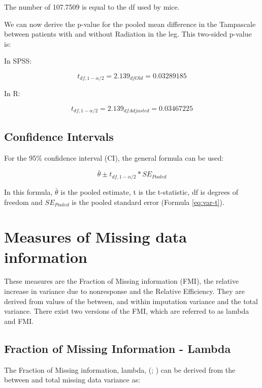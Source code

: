 \documentclass[
]{book}
\begin{document}
The number of 107.7509 is equal to the df used by mice.

We can now derive the p-value for the pooled mean difference in the Tampascale between patients with and without Radiation in the leg. This two-sided p-value is:

In SPSS:

\[t_{df,1-\alpha/2}=2.139_{df{Old}}=0.03289185\]

In R:

\[t_{df,1-\alpha/2}=2.139_{df{Adjusted}}=0.03467225\]

\hypertarget{confidence-intervals}{%
\section{Confidence Intervals}\label{confidence-intervals}}

For the 95\% confidence interval (CI), the general formula can be used:

\begin{equation}
\bar{\theta} ± t_{df,1-\alpha/2} * SE_{Pooled}
  \label{eq:conf}
\end{equation}

In this formula, \(\bar{\theta}\) is the pooled estimate, t is the t-statistic, df is degrees of freedom and \(SE_{Pooled}\) is the pooled standard error (Formula \eqref{eq:var-t}).

\hypertarget{measures-of-missing-data-information}{%
\chapter{Measures of Missing data information}\label{measures-of-missing-data-information}}

These measures are the Fraction of Missing information (FMI), the relative increase in variance due to nonresponse and the Relative Efficiency. They are derived from values of the between, and within imputation variance and the total variance. There exist two versions of the FMI, which are referred to as lambda and FMI.

\hypertarget{fraction-of-missing-information---lambda}{%
\section{Fraction of Missing Information - Lambda}\label{fraction-of-missing-information---lambda}}

The Fraction of Missing information, lambda, (\citet{VanBuuren2018}; \citet{raghunathan2016}) can be derived from the between and total missing data variance as:
\end{document}
